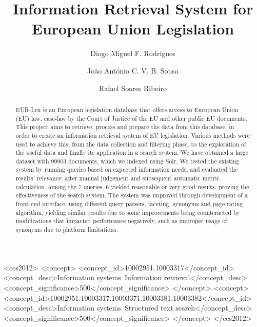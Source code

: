 \documentclass[sigconf, authorversion]{acmart}
\begin{document}
\title{Information Retrieval System for European Union Legislation}

\author{Diogo Miguel F. Rodrigues}

\author{João António C. V. B. Sousa}

\author{Rafael Soares Ribeiro}

\renewcommand{\shortauthors}{Rodrigues, Sousa and Ribeiro}

\begin{abstract}
    EUR-Lex is an European legislation database that offers access to European Union (EU) law,
    case-law by the Court of Justice of the EU and other public EU documents.
    This project aims to retrieve, process and prepare the data from this database, in order to create an information retrieval system of EU legislation.
    Various methods were used to achieve this, from the data collection and filtering phase, to the exploration of the useful data and finally its application in a search system.
    We have obtained a large dataset with \SI{99903}{} documents, which we indexed using Solr. We tested the existing system by running queries based on expected information needs, and evaluated the results' relevance: after manual judgement and subsequent automatic metric calculation, among the 7 queries, 6 yielded reasonable or very good results, proving the effectiveness of the search system.
    The system was improved through development of a front-end interface, using different query parsers, faceting, synonyms and page-rating algorithm, yielding similar results due to some improvements being counteracted by modifications that impacted performance negatively, such as improper usage of synonyms due to platform limitations.
\end{abstract}

\begin{CCSXML}
<ccs2012>
<concept>
<concept_id>10002951.10003317</concept_id>
<concept_desc>Information systems~Information retrieval</concept_desc>
<concept_significance>500</concept_significance>
</concept>
<concept>
<concept_id>10002951.10003317.10003371.10003381.10003382</concept_id>
<concept_desc>Information systems~Structured text search</concept_desc>
<concept_significance>500</concept_significance>
</concept>
</ccs2012>
\end{CCSXML}
\end{document}
